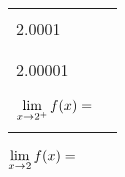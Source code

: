 \documentclass[notes]{subfiles}
\begin{document}
\begin{ex}
\begin{flushleft}
\begin{minipage}{.4\textwidth}
\begin{tabu}{|X[.5,c]|X[1,c]|}
							& \\ \hline
							& \\
					2.0001	& \\
							& \\ \hline
							& \\
					2.00001	& \\
							& \\ \hline\hline
							& \\
					$\displaystyle \lim_{x\to 2^+}f(x) = $ & \\
												& \\ \hline				
				\end{tabu}
				\end{minipage}
				\begin{minipage}{.15\textwidth}
					$\displaystyle \lim_{x\to 2} f(x) =$\\[35pt]\makebox[1.2in]{\hrulefill}
				\end{minipage}
			\end{flushleft}
		\end{ex}		
			\newpage
			
\end{document}

